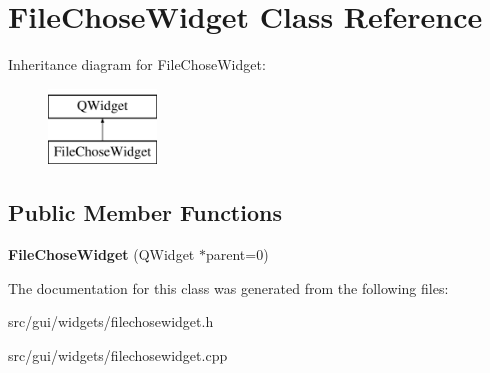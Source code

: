 \hypertarget{classFileChoseWidget}{}\section{File\+Chose\+Widget Class Reference}
\label{classFileChoseWidget}
Inheritance diagram for File\+Chose\+Widget\+:\begin{figure}[H]
\begin{center}
\leavevmode
\includegraphics[height=2.000000cm]{d4/d92/classFileChoseWidget}
\end{center}
\end{figure}
\subsection*{Public Member Functions}
\begin{DoxyCompactItemize}
\item 
\hypertarget{classFileChoseWidget_a4da526f6e1bc5ad021d948665838a9c9}{}{\bfseries File\+Chose\+Widget} (Q\+Widget $\ast$parent=0)\label{classFileChoseWidget_a4da526f6e1bc5ad021d948665838a9c9}

\end{DoxyCompactItemize}


The documentation for this class was generated from the following files\+:\begin{DoxyCompactItemize}
\item 
src/gui/widgets/filechosewidget.\+h\item 
src/gui/widgets/filechosewidget.\+cpp\end{DoxyCompactItemize}
